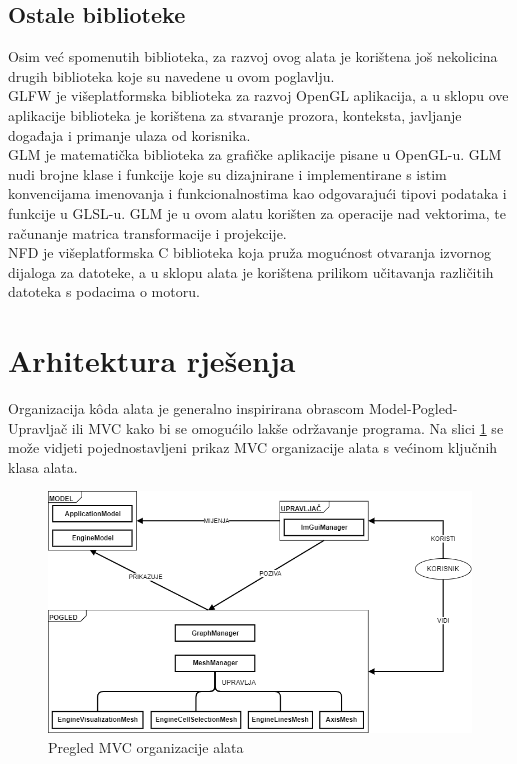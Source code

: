 \documentclass[times, utf8, diplomski]{fer}
\begin{document}
\subsection{Ostale biblioteke}
Osim već spomenutih biblioteka, za razvoj ovog alata je korištena još nekolicina drugih biblioteka koje su navedene u ovom poglavlju.\\

GLFW \citep{glfw} je višeplatformska biblioteka za razvoj OpenGL aplikacija, a u sklopu ove aplikacije biblioteka je korištena za stvaranje prozora, konteksta, javljanje događaja i primanje ulaza od korisnika.\\

GLM \citep{glm} je matematička biblioteka za grafičke aplikacije pisane u OpenGL-u. GLM nudi brojne klase i funkcije koje su dizajnirane i implementirane s istim konvencijama imenovanja i funkcionalnostima kao odgovarajući tipovi podataka i funkcije u GLSL-u. GLM je u ovom alatu korišten za operacije nad vektorima, te računanje matrica transformacije i projekcije.\\

NFD \citep{nfd}  je višeplatformska C biblioteka koja pruža mogućnost otvaranja izvornog dijaloga za datoteke, a u sklopu alata je korištena prilikom učitavanja različitih datoteka s podacima o motoru.

\section{Arhitektura rješenja} \label{codebase-architecture-section}

Organizacija k\^{o}da alata je generalno inspirirana obrascom Model-Pogled-Upravljač ili MVC  kako bi se omogućilo lakše održavanje programa. Na slici \ref{fig:high-level-overview} se može vidjeti pojednostavljeni prikaz MVC organizacije alata s većinom ključnih klasa alata.

\begin{figure} [H]
	\centering
    \includegraphics[width=\textwidth]{high_level_overview.png}
    \caption{Pregled MVC organizacije alata}
    \label{fig:high-level-overview}
\end{figure}
\end{document}
